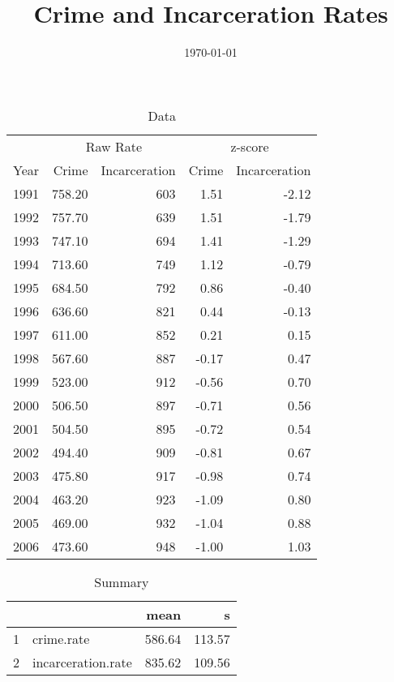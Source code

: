 \documentclass{exam}
\author{}
\title{Crime and Incarceration Rates}
\date{\today}
\begin{document}
  \maketitle

  \begin{table}[H]
    \centering
    \begin{tabular}{rrrrr}
      \toprule
      & \multicolumn{2}{c}{Raw Rate} & \multicolumn{2}{c}{z-score } \\
      \cmidrule(r){2-3} \cmidrule(r){4-5} 
      Year & Crime  & Incarceration & Crime & Incarceration \\
      \midrule
      1991 & 758.20 & 603           & 1.51  & -2.12 \\
      1992 & 757.70 & 639           & 1.51  & -1.79 \\
      1993 & 747.10 & 694           & 1.41  & -1.29 \\
      1994 & 713.60 & 749           & 1.12  & -0.79 \\
      1995 & 684.50 & 792           & 0.86  & -0.40 \\
      1996 & 636.60 & 821           & 0.44  & -0.13 \\
      1997 & 611.00 & 852           & 0.21  & 0.15 \\
      1998 & 567.60 & 887           & -0.17 & 0.47 \\
      1999 & 523.00 & 912           & -0.56 & 0.70 \\
      2000 & 506.50 & 897           & -0.71 & 0.56 \\
      2001 & 504.50 & 895           & -0.72 & 0.54 \\
      2002 & 494.40 & 909           & -0.81 & 0.67 \\
      2003 & 475.80 & 917           & -0.98 & 0.74 \\
      2004 & 463.20 & 923           & -1.09 & 0.80 \\
      2005 & 469.00 & 932           & -1.04 & 0.88 \\
      2006 & 473.60 & 948           & -1.00 & 1.03 \\
      \bottomrule
    \end{tabular}
    \caption{Data}
  \end{table}

  \begin{table}[ht]
    \centering
    \begin{tabular}{rlrr}
      \toprule
        &                    & mean   & s \\
      \midrule
      1 & crime.rate         & 586.64 & 113.57 \\
      2 & incarceration.rate & 835.62 & 109.56 \\
      \bottomrule
    \end{tabular}
    \caption{Summary}
  \end{table}
\end{document}
